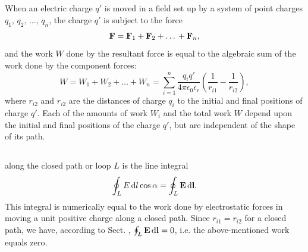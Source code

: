 \subsection{}\label{16.1.3} When an electric charge $q'$ is moved in a field set up by a system of point charges $q_{1}, \,q_{2}, \,\ldots{}, \,q_{n}$, the charge $q'$ is subject to the force
\begin{equation*}%
\vb{F}= \vb{F}_{1} + \vb{F}_{2} + \ldots{} + \vb{F}_{n},
\end{equation*}
and the work $W$ done by the resultant force is equal to the algebraic sum of the work done by the component forces:
\begin{equation*}%
W = W_{1} + W_{2} + \ldots{} + W_{n} = \sum_{i=1}^{n} \frac{q_{i}q'}{4 \pi \epsilon_{0} \epsilon_{r}} \left( \frac{1}{r_{i1}} - \frac{1}{r_{i2}} \right),
\end{equation*}
where $r_{i2}$ and $r_{i2}$ are the distances of charge $q_{i}$ to the initial and final positions of charge $q'$. Each of the amounts of work $W_{i}$ and the total work $W$ depend upon the initial and final positions of the charge $q'$, but are independent of the shape of its path.

\subsection{}\label{16.1.4}  along the closed path or loop $L$ is the line integral
\begin{equation*}%
\oint_{L} E \, \dd l \cos \alpha = \oint_{L} \vb{E} \, \dd \vb{l}.
\end{equation*}
This integral is numerically equal to the work done by electrostatic forces in moving a unit positive charge along a closed path. Since $r_{i1} = r_{i2}$ for a closed path, we have, according to Sect. , $\oint_{L} \vb{E} \, \dd \vb{l} = 0$, i.e. the above-mentioned work equals zero.

